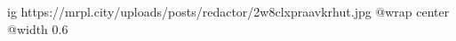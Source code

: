  
 
 
 
 

\ifcmt
  ig https://mrpl.city/uploads/posts/redactor/2w8clxpraavkrhut.jpg
  @wrap center
  @width 0.6
\fi

